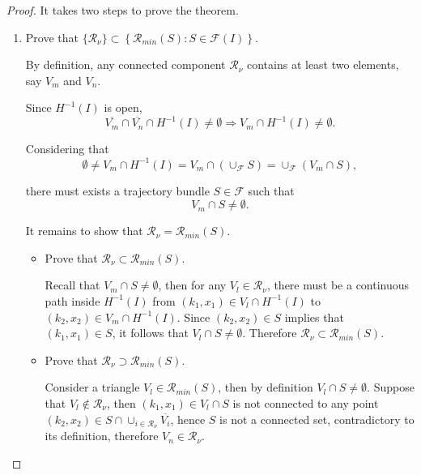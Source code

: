 \documentclass[10pt,a4paper]{amsart}
\begin{document}
\begin{proof}
    It takes two steps to prove the theorem.
    \begin{enumerate}
        \item Prove that $\{\mathcal{R}_{\nu}\} \subset \left\{ \mathcal{R}_{min}(S):S\in\mathcal{F}(I)\right\} $.

        By definition, any connected component $\mathcal{R}_{\nu}$ contains at least two elements, say $V_{m}$ and $V_{n}$. 
        
        Since $H^{-1}(I)$ is open,
        \begin{equation*}
            \overline{V_{m}}\cap\overline{V_{n}}\cap H^{-1}(I)\neq\emptyset\Rightarrow V_{m}\cap H^{-1}(I)\neq\emptyset.
        \end{equation*}

        Considering that
        \begin{equation*}
            \emptyset \neq V_{m}\cap H^{-1}(I)=V_{m}\cap\left(\cup_{\mathcal{F}}S\right)=\cup_{\mathcal{F}}\left(V_{m}\cap S\right),
        \end{equation*}
        
        there must exists a trajectory bundle $S\in \mathcal{F}$ such that
        \begin{equation*}
            V_{m}\cap S \neq \emptyset.
        \end{equation*}

        It remains to show that $\mathcal{R}_{\nu}=\mathcal{R}_{min}(S)$.
        \begin{itemize}
            \item Prove that $\mathcal{R}_{\nu} \subset \mathcal{R}_{min}(S)$.

            Recall that $V_{m}\cap S \neq \emptyset$, then for any $V_{l}\in \mathcal{R}_{\nu}$, there must be a continuous path inside $H^{-1}(I)$ from $(k_{1}, x_{1}) \in V_{l}\cap H^{-1}(I)$ to  $(k_{2}, x_{2}) \in V_{m}\cap H^{-1}(I)$. 
            Since $(k_{2}, x_{2}) \in S$ implies that $(k_{1}, x_{1}) \in S$, it follows that $V_{l}\cap S \neq \emptyset$. Therefore $\mathcal{R}_{\nu} \subset \mathcal{R}_{min}(S)$.
            
            \item Prove that $\mathcal{R}_{\nu} \supset \mathcal{R}_{min}(S)$.

            Consider a triangle $V_{l} \in \mathcal{R}_{min}(S)$, then by definition $V_{l} \cap S \neq \emptyset$. Suppose that $V_{l} \notin \mathcal{R}_{\nu}$, then $(k_{1}, x_{1})\in V_{l} \cap S$ is not connected to any point $(k_{2}, x_{2}) \in S\cap\cup_{i\in\mathcal{R}_{\nu}}\overline{V_{i}}$, hence $S$ is not a connected set, contradictory to its definition, therefore $V_{n} \in \mathcal{R}_{\nu}$.
        \end{itemize}
        

\end{enumerate}
\end{proof}
\end{document}
